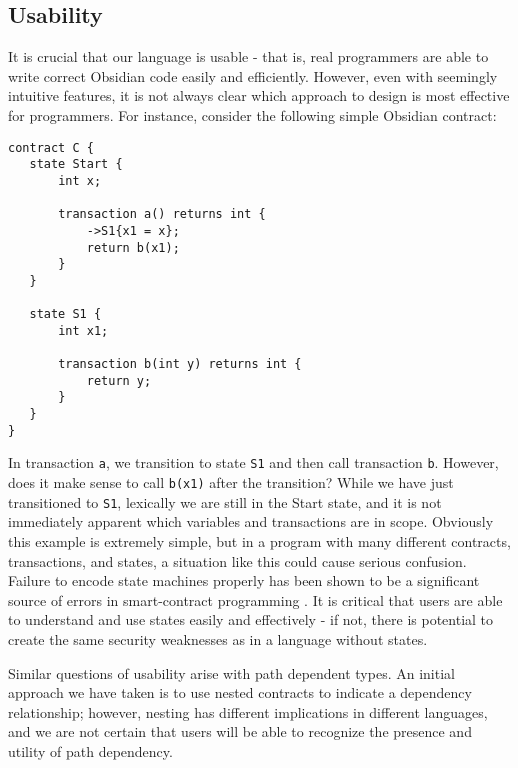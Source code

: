 \documentclass[sigplan,10pt,review]{acmart}\settopmatter{printfolios=true}
\begin{document}
\subsection{Usability}
It is crucial that our language is usable - that is, real programmers are able to write correct Obsidian 
code easily and efficiently. However, even with seemingly intuitive features, it is not always clear 
which approach to design is most effective for programmers. For instance, consider the following simple 
Obsidian contract:

\begin{lstlisting}
contract C {
   state Start {
       int x;
  
       transaction a() returns int {
           ->S1{x1 = x};
           return b(x1);
       }
   }
  
   state S1 {
       int x1;
      
       transaction b(int y) returns int {
           return y;
       }
   }
}
\end{lstlisting}

In transaction \texttt{\small{a}}, we transition to state \texttt{\small{S1}} and then call transaction \texttt{\small{b}}. 
However, does it make sense to call \texttt{\small{b(x1)}} after the transition? While we have just 
transitioned to \texttt{\small{S1}}, lexically we are still in the 
Start state, and it is not immediately apparent which variables and transactions are in scope. 
Obviously this example is extremely simple, but in a program with many different contracts, 
transactions, and states, a situation like this could cause serious confusion. Failure to encode state 
machines properly has been shown to be a significant source of errors in smart-contract 
programming \cite{Delmolino}. It is critical that users are able to understand and use states easily and 
effectively - if not, there is potential to create the same security weaknesses as in a 
language without states. 

	Similar questions of usability arise with path dependent types. An initial approach we have taken is 
to use nested contracts to indicate a dependency relationship; however, nesting has different 
implications in different languages, and we are not certain that users will be able to recognize the 
presence and utility of path dependency. 
\end{document}

